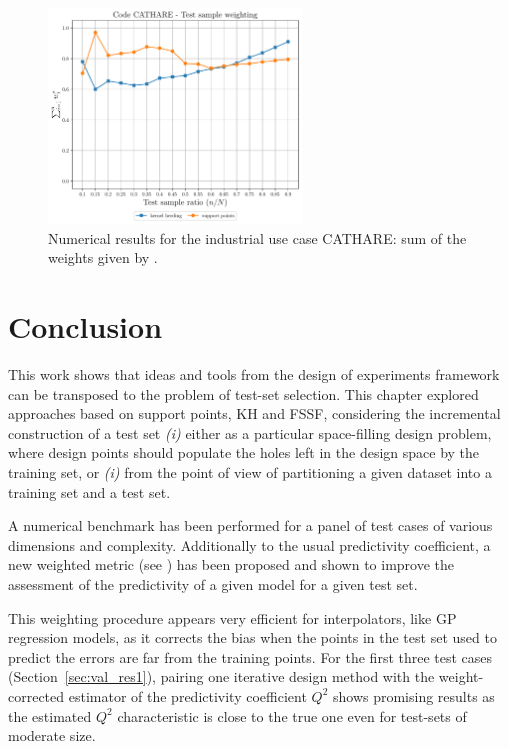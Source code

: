 \begin{figure}
  \centering
  \includegraphics[width=0.6\textwidth]{./part2/figures/SIS/cathareC2_weights.pdf}
  \caption{Numerical results for the industrial use case CATHARE: sum of the weights given by .}
  \label{fig:catharec2_weights}
\end{figure}




\section{Conclusion}\label{sec:val_conclusion}

This work shows that ideas and tools from the design of experiments framework can be transposed to the problem of test-set selection. 
This chapter explored approaches based on support points, KH and FSSF, considering the incremental construction of a test set \textit{(i)} either as a particular space-filling design problem, where design points should populate the holes left in the design space by the training set, or \textit{(i)} from the point of view of partitioning a given dataset into a training set and a test set. 

A numerical benchmark has been performed for a panel of test cases of various dimensions and complexity. 
Additionally to the usual predictivity coefficient, a new weighted metric (see \citealp{pronzato_rendas_2021}) has been proposed and shown to improve the assessment of the predictivity of a given model for a given test set. 

This weighting procedure appears very efficient for interpolators, like GP regression models, as it corrects the bias when the points in the test set used to predict the errors are far from the training points. 
For the first three test cases (Section~\ref{sec:val_res1}), pairing one iterative design method with the weight-corrected estimator of the predictivity coefficient $Q^2$ shows promising results as the estimated $Q^2$ characteristic is close to the true one even for test-sets of moderate size. 

